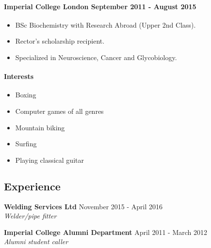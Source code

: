 \documentclass[]{article}
\providecommand{\tightlist}{%
  \setlength{\itemsep}{0pt}\setlength{\parskip}{0pt}}
\let\oldparagraph\paragraph
\renewcommand{\paragraph}[1]{\oldparagraph{#1}\mbox{}}
\begin{document}
\paragraph{Imperial College London \textbar{} September 2011 - August
2015}\label{imperial-college-london-september-2011---august-2015}

\begin{itemize}
\tightlist
\item
  BSc Biochemistry with Research Abroad (Upper 2nd Class).
\item
  Rector's scholarship recipient.
\item
  Specialized in Neuroscience, Cancer and Glycobiology.
\end{itemize}

\paragraph{Interests}\label{interests}

\begin{itemize}
\tightlist
\item
  Boxing
\item
  Computer games of all genres
\item
  Mountain biking
\item
  Surfing
\item
  Playing classical guitar
\end{itemize}

\subsection{Experience}\label{experience}

\textbf{Welding Services Ltd} \textbar{} November 2015 - April 2016\\
\emph{Welder/pipe fitter}

\textbf{Imperial College Alumni Department} \textbar{} April 2011 -
March 2012\\
\emph{Alumni student caller}
\end{document}
